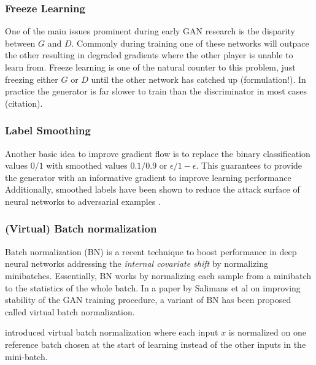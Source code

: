 \subsubsection{Freeze Learning}
\label{ssub:gan_freeze_learning}
One of the main issues prominent during early GAN research is the disparity between $G$ and $D$.
Commonly during training one of these networks will outpace the other resulting in degraded gradients where the other player is unable to learn from.
Freeze learning is one of the natural counter to this problem, just freezing either $G$ or $D$ until the other network has catched up (formulation!).
In practice the generator is far slower to train than the discriminator in most cases (citation).


\subsubsection{Label Smoothing}
\label{ssub:gan_label_smoothing}
Another basic idea to improve gradient flow is to replace the binary classification values $0/1$ with smoothed values $0.1/0.9$ or $\epsilon/1-\epsilon$.
This guarantees to provide the generator with an informative gradient to improve learning performance
Additionally, smoothed labels have been shown to reduce the attack surface of neural networks to adversarial examples \cite{adv_examples:2016}.


\subsubsection{(Virtual) Batch normalization}
\label{ssub:gan_batch_norm}
Batch normalization (BN) \cite{batch_norm:2015} is a recent technique to boost performance in deep neural networks addressing the \emph{internal covariate shift} by normalizing minibatches.
Essentially, BN works by normalizing each sample from a minibatch to the statistics of the whole batch.
In a paper \cite{improved_gan:2016} by Salimans et al on improving stability of the GAN training procedure, a variant of BN has been proposed called virtual batch normalization.


\cite{improved_gan:2016} introduced virtual batch normalization where each input $x$ is normalized on one reference batch chosen at the start of learning instead of the other inputs in the mini-batch.

